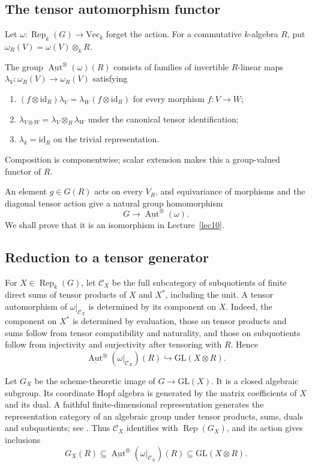 \subsection*{The tensor automorphism functor}
Let $\omega:\operatorname{Rep}_k(G)\to\mathrm{Vec}_k$ forget the action. For a commutative $k$-algebra $R$, put $\omega_R(V)=\omega(V)\otimes_kR$.
\begin{definition}
The group $\underline{\operatorname{Aut}}^{\otimes}(\omega)(R)$ consists of families of invertible $R$-linear maps $\lambda_V:\omega_R(V)\to\omega_R(V)$ satisfying
\begin{enumerate}
\item $(f\otimes\mathrm{id}_R)\lambda_V=\lambda_W(f\otimes\mathrm{id}_R)$ for every morphism $f:V\to W$;
\item $\lambda_{V\otimes W}=\lambda_V\otimes_R\lambda_W$ under the canonical tensor identification;
\item $\lambda_k=\mathrm{id}_R$ on the trivial representation.
\end{enumerate}
Composition is componentwise; scalar extension makes this a group-valued functor of $R$.
\end{definition}
An element $g\in G(R)$ acts on every $V_R$, and equivariance of morphisms and the diagonal tensor action give a natural group homomorphism
\[
 G\longrightarrow\underline{\operatorname{Aut}}^{\otimes}(\omega).
\]
We shall prove that it is an isomorphism in Lecture~\ref{lec10}.

\subsection*{Reduction to a tensor generator}
For $X\in\operatorname{Rep}_k(G)$, let $\mathcal C_X$ be the full subcategory of subquotients of finite direct sums of tensor products of $X$ and $X^*$, including the unit. A tensor automorphism of $\omega|_{\mathcal C_X}$ is determined by its component on $X$. Indeed, the component on $X^*$ is determined by evaluation, those on tensor products and sums follow from tensor compatibility and naturality, and those on subquotients follow from injectivity and surjectivity after tensoring with $R$. Hence
\[
 \underline{\operatorname{Aut}}^{\otimes}(\omega|_{\mathcal C_X})(R)
 \hookrightarrow\mathrm{GL}(X\otimes R).
\]

Let $G_X$ be the scheme-theoretic image of $G\to\mathrm{GL}(X)$. It is a closed algebraic subgroup. Its coordinate Hopf algebra is generated by the matrix coefficients of $X$ and its dual. A faithful finite-dimensional representation generates the representation category of an algebraic group under tensor products, sums, duals and subquotients; see \cite[Chapter VIII, Section 11]{milneAGS}. Thus $\mathcal C_X$ identifies with $\operatorname{Rep}(G_X)$, and its action gives inclusions
\[
 G_X(R)\subseteq
 \underline{\operatorname{Aut}}^{\otimes}(\omega|_{\mathcal C_X})(R)
 \subseteq\mathrm{GL}(X\otimes R).
\]

